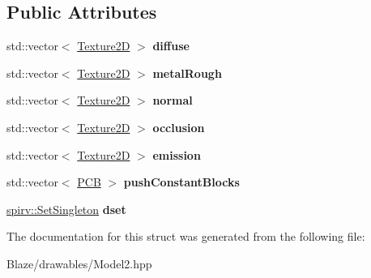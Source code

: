 \subsection*{Public Attributes}
\begin{DoxyCompactItemize}
\item 
\mbox{\label{structblaze_1_1Model2_1_1Material_ac3fd90868cb95e60bd52963bfd6f04d9}} 
std\+::vector$<$ \hyperlink{classblaze_1_1Texture2D}{Texture2D} $>$ {\bfseries diffuse}
\item 
\mbox{\label{structblaze_1_1Model2_1_1Material_aa880b09bf912f7d8034939491fa91ca9}} 
std\+::vector$<$ \hyperlink{classblaze_1_1Texture2D}{Texture2D} $>$ {\bfseries metal\+Rough}
\item 
\mbox{\label{structblaze_1_1Model2_1_1Material_a4131601161b987fa3225d8752f3e880e}} 
std\+::vector$<$ \hyperlink{classblaze_1_1Texture2D}{Texture2D} $>$ {\bfseries normal}
\item 
\mbox{\label{structblaze_1_1Model2_1_1Material_a01029d3c65ac387fa5a9a0425a630ccf}} 
std\+::vector$<$ \hyperlink{classblaze_1_1Texture2D}{Texture2D} $>$ {\bfseries occlusion}
\item 
\mbox{\label{structblaze_1_1Model2_1_1Material_a4d50bfb71a69f0d8db6dce99b50619b4}} 
std\+::vector$<$ \hyperlink{classblaze_1_1Texture2D}{Texture2D} $>$ {\bfseries emission}
\item 
\mbox{\label{structblaze_1_1Model2_1_1Material_a025e977e1129e68a1356faaaa09d5707}} 
std\+::vector$<$ \hyperlink{structblaze_1_1Model2_1_1Material_1_1PCB}{P\+CB} $>$ {\bfseries push\+Constant\+Blocks}
\item 
\mbox{\label{structblaze_1_1Model2_1_1Material_aec73e74f9aab3b9884b572cddc084638}} 
\hyperlink{structblaze_1_1spirv_1_1SetSingleton}{spirv\+::\+Set\+Singleton} {\bfseries dset}
\end{DoxyCompactItemize}


The documentation for this struct was generated from the following file\+:\begin{DoxyCompactItemize}
\item 
Blaze/drawables/Model2.\+hpp\end{DoxyCompactItemize}
